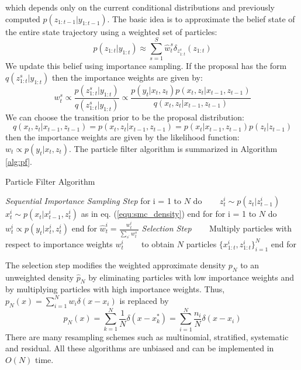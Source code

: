 which depends only on the current conditional distributions and previously computed $p(z_{1:t-1}|y_{1:t-1})$. The basic idea is to approximate the belief state of the entire state trajectory using a weighted set of particles:
\begin{equation}
    p(z_{1:t}|y_{1:t}) \approx \sum_{s=1}^{S}\hat{w}_{t}^{s}\delta_{z_{1:t}^{s}}(z_{1:t})
\end{equation}
We update this belief using importance sampling. If the proposal has the form $q(z_{1:t}^{s}|y_{1:t})$ then the importance weights are given by:
\begin{equation}
    w_{t}^{s} \propto \frac{p(z_{1:t}^{s}|y_{1:t})}{q(z_{1:t}^{s}|y_{1:t})} \propto \frac{p(y_t|x_t,z_t)p(x_t, z_t|x_{t-1},z_{t-1})}{q(x_t,z_t|x_{t-1},z_{t-1})} 
\end{equation}
We can choose the transition prior to be the proposal distribution:
\begin{equation}
     q(x_t,z_t|x_{t-1},z_{t-1}) = p(x_t, z_t|x_{t-1},z_{t-1}) = p(x_t|x_{t-1},z_{t-1})p(z_t|z_{t-1})
\end{equation}
then the importance weights are given by the likelihood function: $w_t \propto p(y_t|x_t,z_t)$. The particle filter algorithm is summarized in Algorithm \ref{alg:pf}.

\begin{algorithm}
\caption{Particle Filter Algorithm \cite{deFreitas2002}}
\label{alg:pf}
\begin{algorithmic}[1]
\STATE \textit{Sequential Importance Sampling Step}
\STATE for i = 1 to $N$ do  
\STATE ~~~ $z_{t}^{i} \sim p(z_t|z_{t-1}^{i})$ 
\STATE ~~~ $x_{t}^{i} \sim p(x_t|x_{t-1}^{i}, z_{t}^{i})$ as in eq. (\ref{equ:smc_density})
\STATE end for 
\STATE for i = 1 to $N$ do 
\STATE ~~~ $w_{t}^{i} \propto p(y_t|x_{t}^{i}, z_{t}^{i})$
\STATE end for
\STATE $\hat{w}_{t}^{i} = \frac{w_{t}^{i}}{\sum_{s^{\prime}}w_{t}^{s^{\prime}}}$ 
\STATE \textit{Selection Step}
\STATE ~~~ Multiply particles with respect to importance weights $w_{t}^{i}$
\STATE ~~~ to obtain $N$ particles $\{x_{1:t}^{i},z_{1:t}^{i}\}_{i=1}^{N}$
\STATE end for
\end{algorithmic}
\end{algorithm}

The selection step modifies the weighted approximate density $p_N$ to an unweighted density $\hat{p}_N$ by eliminating particles with low importance weights and by multiplying particles with high importance weights. Thus, $p_N(x)=\sum_{i=1}^{N}w_i\delta(x-x_i)$ is replaced by
\begin{equation}
    \hat{p}_N(x) = \sum_{k=1}^{N}\frac{1}{N}\delta(x-x_{k}^{\ast}) = \sum_{i=1}^{N}\frac{n_i}{N}\delta(x-x_i)
\end{equation}
There are many resampling schemes such as multinomial, stratified, systematic and residual.
All these algorithms are unbiased and can be implemented in $O(N)$ time.\\

